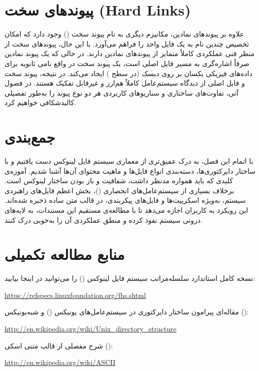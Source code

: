 \section{پیوندهای سخت (Hard Links)}

علاوه بر پیوندهای نمادین، مکانیزم دیگری به نام پیوند سخت () وجود دارد که امکان تخصیص چندین نام به یک فایل واحد را فراهم می‌آورد. با این حال، پیوندهای سخت از منظر فنی عملکردی کاملاً متمایز از پیوندهای نمادین دارند. در حالی که یک پیوند نمادین صرفاً اشاره‌گری به مسیر فایل اصلی است، یک پیوند سخت در واقع نامی ثانویه برای داده‌های فیزیکی یکسان بر روی دیسک (در سطح ) ایجاد می‌کند. در نتیجه، پیوند سخت و فایل اصلی از دیدگاه سیستم‌عامل کاملاً هم‌ارز و غیرقابل تفکیک هستند. در فصول آتی، تفاوت‌های ساختاری و سناریوهای کاربردی هر دو نوع پیوند را به‌طور تفصیلی کالبدشکافی خواهیم کرد.

\section{جمع‌بندی}

با اتمام این فصل، به درک عمیق‌تری از معماری سیستم‌ فایل لینوکس دست یافتیم و با ساختار دایرکتوری‌ها، دسته‌بندی انواع فایل‌ها و ماهیت محتوای آن‌ها آشنا شدیم. آموزه‌ی کلیدی که باید همواره مدنظر داشت، شفافیت و باز بودن ساختار لینوکس است. برخلاف بسیاری از سیستم‌عامل‌های انحصاری ()، بخش اعظم فایل‌های راهبردی سیستم، به‌ویژه اسکریپت‌ها و فایل‌های پیکربندی، در قالب متن ساده ذخیره شده‌اند. این رویکرد به کاربران اجازه می‌دهد تا با مطالعه‌ی مستقیم این مستندات، به لایه‌های درونی سیستم نفوذ کرده و منطق عملکردی آن را به‌خوبی درک کنند.

\section{منابع مطالعه تکمیلی}

نسخه کامل استاندارد سلسله‌مراتب سیستم فایل لینوکس () را می‌توانید در اینجا بیابید:

\begin{latin}
\url{https://refspecs.linuxfoundation.org/fhs.shtml}
\end{latin}

مقاله‌ای پیرامون ساختار دایرکتوری در سیستم‌عامل‌های یونیکس () و شبه‌یونیکس ():

\begin{latin}
\url{http://en.wikipedia.org/wiki/Unix_directory_structure}
\end{latin}

شرح مفصلی از قالب متنی اسکی ():

\begin{latin}
\url{http://en.wikipedia.org/wiki/ASCII}
\end{latin}